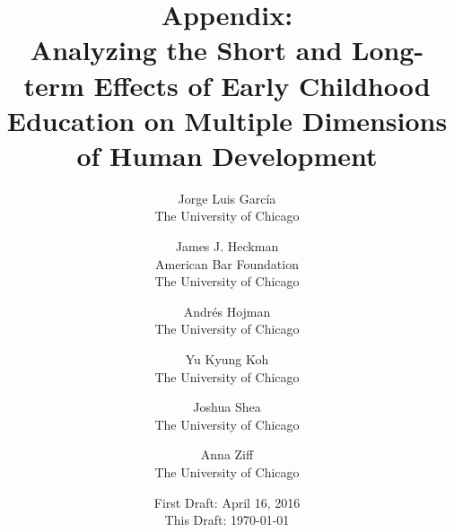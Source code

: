 




\title{\Large \textbf{Appendix: \\ Analyzing the Short and Long-term Effects of Early Childhood Education on Multiple Dimensions of Human Development}}

\author{
Jorge Luis Garc\'{i}a\\
The University of Chicago \and
James J. Heckman \\
American Bar Foundation \\
The University of Chicago \and
Andr\'{e}s Hojman\\
The University of Chicago \and
Yu Kyung Koh \\ 
The University of Chicago \and
Joshua Shea \\
The University of Chicago \and
Anna Ziff \\ 
The University of Chicago}
\date{First Draft: April 16, 2016\\ This Draft: \today}
\maketitle

\singlespacing
\tableofcontents
\listoffigures
\listoftables
\pagebreak


